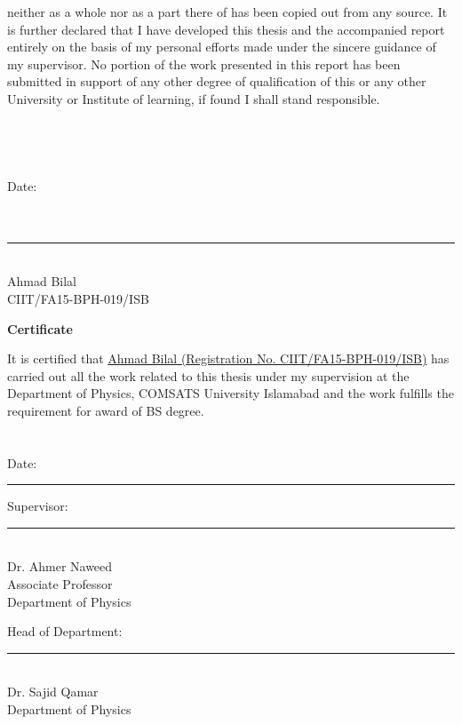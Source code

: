 \documentclass[12pt,twoside]{report}
\begin{document}
neither as a whole nor as a part there of has been copied out from any source. It is
further declared that I have developed this thesis and the accompanied report entirely
on the basis of my personal efforts made under the sincere guidance of my supervisor.
No portion of the work presented in this report has been submitted in support of any
other degree of qualification of this or any other University or Institute of learning, if
found I shall stand responsible.  \\\\\\\\\\
Date: \underline{}  \\\\\\
\begin{flushright}

	\noindent\rule{4cm}{0.4pt} \\  Ahmad Bilal \\   CIIT/FA15-BPH-019/ISB 

\end{flushright}

	
\newpage
\begin{center}
\textbf{\Large{Certificate}}\\
\end{center}
It is certified that \underline{Ahmad Bilal (Registration No. CIIT/FA15-BPH-019/ISB)} has carried out all the work related to this thesis under my supervision at the Department of Physics, COMSATS University Islamabad and the work fulfills the requirement for award of BS degree. \\\\\\
Date: \noindent\rule{3cm}{0.4pt}
\vspace{2.5cm}
\begin{flushright}
Supervisor: \\
\noindent\rule{4cm}{0.4pt}\\
Dr. Ahmer Naweed \\
Associate Professor\\ Department of Physics\\
\end{flushright}
\vspace{3cm}
Head of Department: \\
\noindent\rule{4cm}{0.4pt}\\
Dr. Sajid Qamar \\
Department of Physics
\newpage	
\end{document}
